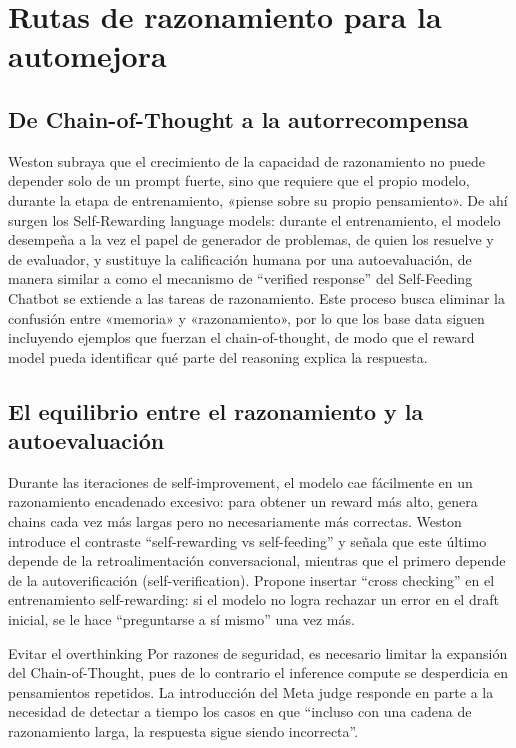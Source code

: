 \section{Rutas de razonamiento para la automejora}
\subsection{De Chain-of-Thought a la autorrecompensa}
Weston subraya que el crecimiento de la capacidad de razonamiento no puede depender solo de un prompt fuerte, sino que requiere que el propio modelo, durante la etapa de entrenamiento, «piense sobre su propio pensamiento». De ahí surgen los Self-Rewarding language models: durante el entrenamiento, el modelo desempeña a la vez el papel de generador de problemas, de quien los resuelve y de evaluador, y sustituye la calificación humana por una autoevaluación, de manera similar a como el mecanismo de ``verified response'' del Self-Feeding Chatbot se extiende a las tareas de razonamiento. Este proceso busca eliminar la confusión entre «memoria» y «razonamiento», por lo que los base data siguen incluyendo ejemplos que fuerzan el chain-of-thought, de modo que el reward model pueda identificar qué parte del reasoning explica la respuesta.

\subsection{El equilibrio entre el razonamiento y la autoevaluación}
Durante las iteraciones de self-improvement, el modelo cae fácilmente en un razonamiento encadenado excesivo: para obtener un reward más alto, genera chains cada vez más largas pero no necesariamente más correctas. Weston introduce el contraste ``self-rewarding vs self-feeding'' y señala que este último depende de la retroalimentación conversacional, mientras que el primero depende de la autoverificación (self-verification). Propone insertar ``cross checking'' en el entrenamiento self-rewarding: si el modelo no logra rechazar un error en el draft inicial, se le hace ``preguntarse a sí mismo'' una vez más.

\begin{warningbox}{Evitar el overthinking}
Por razones de seguridad, es necesario limitar la expansión del Chain-of-Thought, pues de lo contrario el inference compute se desperdicia en pensamientos repetidos. La introducción del Meta judge responde en parte a la necesidad de detectar a tiempo los casos en que ``incluso con una cadena de razonamiento larga, la respuesta sigue siendo incorrecta''.
\end{warningbox}


